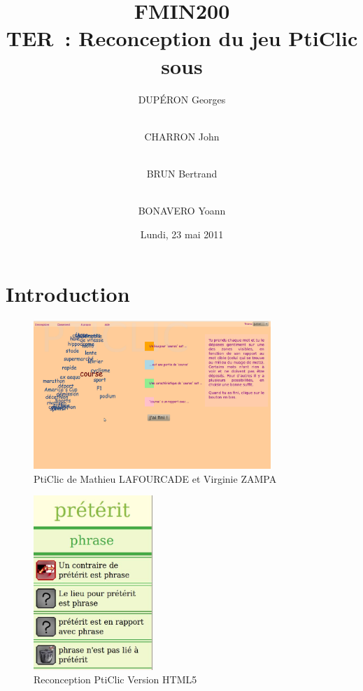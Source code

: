 \documentclass{beamer}
\title{FMIN200 \\ TER~: Reconception du jeu PtiClic sous \android{}}
\author{DUPÉRON Georges \and\\ CHARRON John \and\\ BRUN Bertrand \and\\ BONAVERO Yoann}
\institute{Université Montpellier II, Département informatique}
\date{Lundi, 23 mai 2011}
\begin{document}
\begin{frame}
  \titlepage
\end{frame}

\section{Introduction}

\begin{frame}  
\begin{figure}[h!]
  \centering
      \includegraphics[width=0.8\textwidth]{img/PtiClicJeu.png}
\caption{PtiClic de Mathieu LAFOURCADE et Virginie ZAMPA}
\end{figure}
\end{frame}

\begin{frame}  
\begin{figure}[h!]
  \centering
      \includegraphics[width=0.4\textwidth]{img/preterit01.jpg}
\caption{Reconception PtiClic Version HTML5}
\end{figure}
\end{frame}
\end{document}
